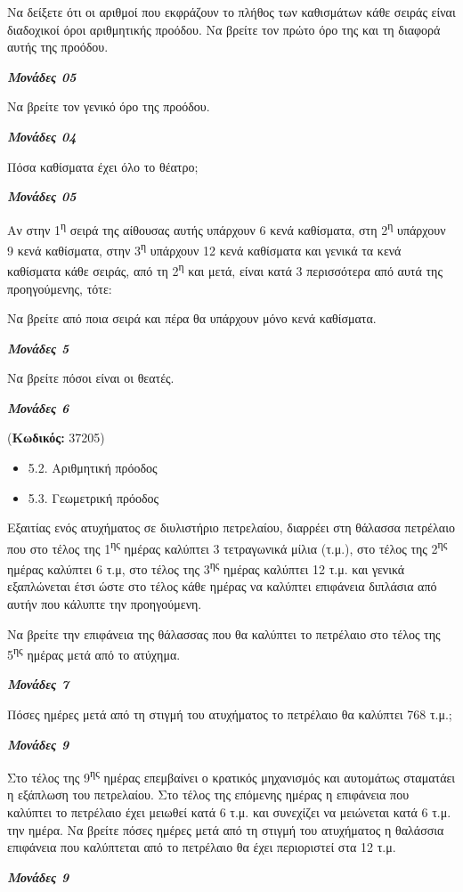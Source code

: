 \documentclass[11pt,a4paper,twoside]{book}
\newcounter{askhsh}[chapter]
\renewcommand{\theaskhsh}{
	\bf{\titlefont{\Large{\thechapter}}.\arabic{askhsh}}
}
\newcommand{\Askhsh}[2]{\refstepcounter{askhsh}{\titlefont{Άσκηση\theaskhsh} - \textcolor{maincolor}{ΘΕΜΑ #2}} ({\small{\textbf{Κωδικός:} #1}})\\}{}
\newenvironment{ylh}{
\begin{tcolorbox}[
breakable,
enhanced standard,
titlerule=0pt,
toprule=0pt, 
rightrule=0pt, 
bottomrule=0pt,
title={\titlefont Ύλη άσκησης},
colback=white,
opacityback=0,
left=2mm,
top=1mm,
bottom=0mm,
boxrule=0pt,
colframe=white,
borderline west={1.5mm}{0pt}{secondarycolor},
leftrule=2mm,
sharp corners,
coltitle=black
]
\begin{itemize}[leftmargin=3mm, itemsep=0mm, label=\textcolor{secondarycolor}{{\small\faBook}}]
}{
\end{itemize}
\end{tcolorbox}
}
\newcommand{\monades}[1]{
\hspace*{\fill}
\textbf{\textit{\textcolor{maincolor}{Μονάδες #1}}}}
\begin{document}
\begin{alist}
\item Να δείξετε ότι οι αριθμοί που εκφράζουν το πλήθος των καθισμάτων κάθε σειράς είναι διαδοχικοί όροι αριθμητικής προόδου. Να βρείτε τον πρώτο όρο της και τη διαφορά αυτής της προόδου.
\monades{05}
\item Να βρείτε τον γενικό όρο της προόδου.
\monades{04}
\item Πόσα καθίσματα έχει όλο το θέατρο;
\monades{05}
\item Αν στην 1\textsuperscript{η} σειρά της αίθουσας αυτής υπάρχουν 6 κενά καθίσματα, στη 2\textsuperscript{η} υπάρχουν 9 κενά καθίσματα, στην 3\textsuperscript{η} υπάρχουν 12 κενά καθίσματα και γενικά τα κενά καθίσματα κάθε σειράς, από τη 2\textsuperscript{η} και μετά, είναι κατά 3 περισσότερα από αυτά της προηγούμενης, τότε:
\begin{rlist}
\item
  Να βρείτε από ποια σειρά και πέρα θα υπάρχουν μόνο κενά καθίσματα.
\monades{5}
\item
  Να βρείτε πόσοι είναι οι θεατές.
\monades{6}
\end{rlist}
\end{alist}

\vspace{4mm}
\Askhsh{37205}{4}
\begin{ylh}
    \item 5.2. Αριθμητική πρόοδος
    \item 5.3. Γεωμετρική πρόοδος
\end{ylh}

Εξαιτίας ενός ατυχήματος σε διυλιστήριο πετρελαίου, διαρρέει στη θάλασσα πετρέλαιο που στο τέλος της 1\textsuperscript{ης} ημέρας καλύπτει 3 τετραγωνικά μίλια (τ.μ.), στο τέλος της 2\textsuperscript{ης} ημέρας καλύπτει 6 τ.μ, στο τέλος της 3\textsuperscript{ης} ημέρας καλύπτει 12 τ.μ. και γενικά εξαπλώνεται έτσι ώστε στο τέλος κάθε ημέρας να καλύπτει επιφάνεια διπλάσια από αυτήν που κάλυπτε την προηγούμενη.

\begin{alist}
\item Να βρείτε την επιφάνεια της θάλασσας που θα καλύπτει το πετρέλαιο στο τέλος της 5\textsuperscript{ης} ημέρας μετά από το ατύχημα.
\monades{7}
\item Πόσες ημέρες μετά από τη στιγμή του ατυχήματος το πετρέλαιο θα καλύπτει 768 τ.μ.;

\monades{9}
\item Στο τέλος της 9\textsuperscript{ης} ημέρας επεμβαίνει ο κρατικός μηχανισμός και αυτομάτως σταματάει η εξάπλωση του πετρελαίου. Στο τέλος της επόμενης ημέρας η επιφάνεια που καλύπτει το πετρέλαιο έχει μειωθεί κατά 6 τ.μ. και συνεχίζει να μειώνεται κατά 6 τ.μ. την ημέρα. Να βρείτε πόσες ημέρες μετά από τη στιγμή του ατυχήματος η θαλάσσια επιφάνεια που καλύπτεται από το πετρέλαιο θα έχει περιοριστεί στα 12 τ.μ.

\monades{9}
\end{alist}
\end{document}

